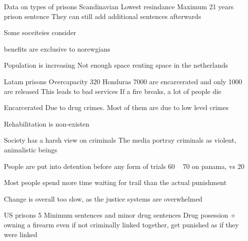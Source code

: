 	Data on types of prisons
		Scandinavian
			Lowest resindance
			Maximum 21 years prison sentence
				They can still add additional sentences afterwards

				Some soceiteies consider 

			benefits are exclusive to norewgians

			Population is increasing
				Not enough space
				renting space in the netherlands

		Latam prisons
			Overcapacity
				320%
				Honduras 7000 are encarcerated and only 1000 are released
					This leads to bad services
					If a fire breaks, a lot of people die

			Encarcerated
				Due to drug crimes. Most of them are due to low level crimes

			Rehabilitation is non-existen

			Society has a harsh view on criminals
				The media portray criminals as violent, animalistic beings

				People are put into detention before any form of trials
					60 ~ 70 on panama, vs 20%

					Most people spend more time waiting for trail than the actual punishment

			Change is overall too slow, as the justice systems are overwhelmed

		US prisons
			5%
				Minimum sentences and minor drug sentences
					Drug posession + owning a firearm even if not criminally linked together, get punished as if they were linked

				

